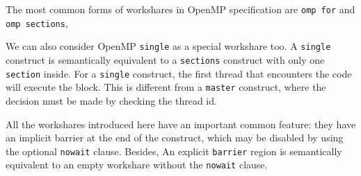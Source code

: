 The most common forms of workshares in OpenMP specification are \texttt{omp for} 
and \texttt{omp sections},

%
%


%

We can also consider OpenMP \texttt{single} as a special workshare too.  A
\texttt{single} construct is semantically equivalent to a \texttt{sections}
construct with only one \texttt{section} inside.  For a \texttt{single}
construct, the first thread that encounters the code will execute the block.
This is different from a \texttt{master} construct, where the decision must be
made by checking the thread id.

All the workshares introduced here have an important common feature: they have
an implicit barrier at the end of the construct, which may be disabled by using
the optional \texttt{nowait} clause. Besides, An explicit \texttt{barrier}
region is semantically equivalent to an empty workshare without the
\texttt{nowait} clause. 

